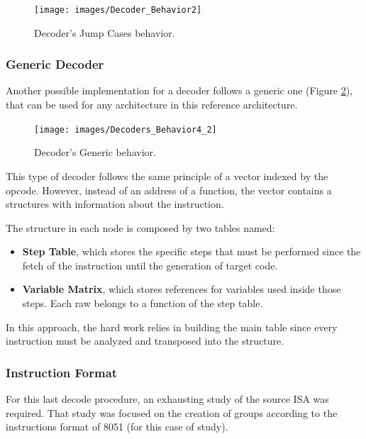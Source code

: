 \begin{figure}[
H]
\centerline{
\texttt{[image: images/Decoder\_Behavior2]}
}
\caption{Decoder's Jump Cases behavior.}
\label{fig:Decoders_Behavior2} 
\end{figure}


\subsubsection{Generic Decoder}

Another possible implementation for a decoder follows a generic one (Figure \ref{fig:Decoders_Behavior4}), that can be used for any architecture in this reference architecture.  


\begin{figure}[!htb]
\centerline{
\texttt{[image: images/Decoders\_Behavior4\_2]}
}
\caption{Decoder's Generic behavior.}
\label{fig:Decoders_Behavior4} 
\end{figure}

This type of decoder follows the same principle of a vector indexed by the opcode. However, instead of an address of a function, the vector contains a structures with information about the instruction. 

The structure in each node is composed by two tables named:
\begin{itemize}
\item \textbf{Step Table}, which stores the specific steps that must be performed since the fetch of the instruction until the generation of target code.
\item \textbf{Variable Matrix}, which stores references for variables used inside those steps. Each raw belongs to a function of the step table.
\end{itemize}

In this approach, the hard work relies in building the main table since every instruction must be analyzed and transposed into the structure.  


    \subsubsection{Instruction Format}
    For this last decode procedure, an exhausting study of the source ISA was required. That study was focused on the creation of groups according to the instructions format of 8051 (for this case of study).
    
